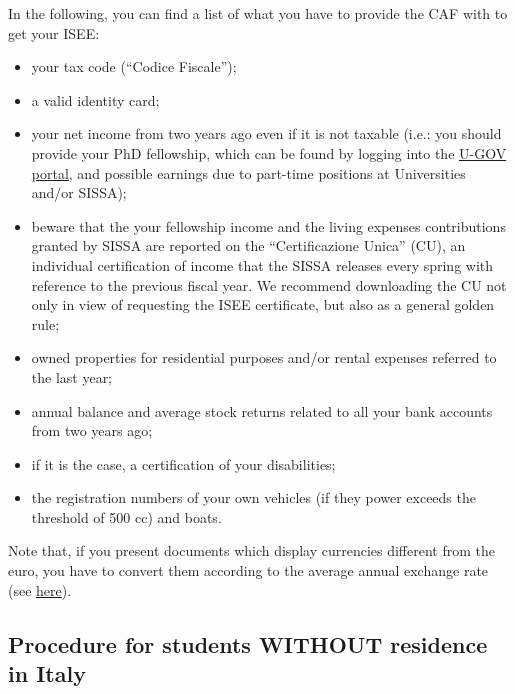 \documentclass{sissavademecum}
\begin{document}
In the following, you can find a list of what you have to provide the CAF with to get your ISEE:
\begin{itemize}
    \item your tax code (``Codice Fiscale'');
    \item a valid identity card;
    \item your net income from two years ago even if it is not taxable (i.e.: you should provide your PhD fellowship, which can be found by logging into the \href{https://www.sissa.u-gov.it/u-gov-ru/bp/desktop.RU99CEDOLID_1914958969.RU99CEDOL/siaru/cedolini/cedolini_main.iface}{U-GOV portal}, and possible earnings due to part-time positions at Universities and/or SISSA);
    \item beware that the your fellowship income and the living expenses contributions granted by SISSA are reported on the ``Certificazione Unica'' (CU), an individual certification of income that the SISSA releases every spring with reference to the previous fiscal year. We recommend downloading the CU not only in view of requesting the ISEE certificate, but also as a general golden rule;
    \item owned properties for residential purposes and/or rental expenses referred to the last year;
    \item annual balance and average stock returns related to all your bank accounts from two years ago;
    \item if it is the case, a certification of your disabilities;
    \item the registration numbers of your own vehicles (if they power exceeds the threshold of 500 cc) and boats.
\end{itemize}
Note that, if you present documents which display currencies different from the euro, you have to convert them according to the average annual exchange rate (see \href{https://tassidicambio.bancaditalia.it/terzevalute-wf-ui-web/averageRates}{here}).

\subsection{Procedure for students WITHOUT residence in Italy}
\end{document}
